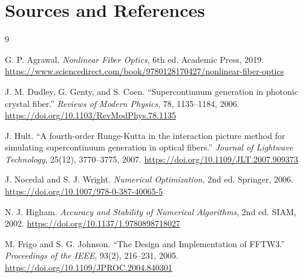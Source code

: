 \documentclass[11pt]{article}
\begin{document}
\section{Sources and References}

\begin{thebibliography}{9}

G. P. Agrawal.
\textit{Nonlinear Fiber Optics}, 6th ed.
Academic Press, 2019.
\url{https://www.sciencedirect.com/book/9780128170427/nonlinear-fiber-optics}

J. M. Dudley, G. Genty, and S. Coen.
``Supercontinuum generation in photonic crystal fiber.''
\textit{Reviews of Modern Physics}, 78, 1135--1184, 2006.
\url{https://doi.org/10.1103/RevModPhys.78.1135}

J. Hult.
``A fourth-order Runge-Kutta in the interaction picture method for simulating
supercontinuum generation in optical fibers.''
\textit{Journal of Lightwave Technology}, 25(12), 3770--3775, 2007.
\url{https://doi.org/10.1109/JLT.2007.909373}

J. Nocedal and S. J. Wright.
\textit{Numerical Optimization}, 2nd ed.
Springer, 2006.
\url{https://doi.org/10.1007/978-0-387-40065-5}

N. J. Higham.
\textit{Accuracy and Stability of Numerical Algorithms}, 2nd ed.
SIAM, 2002.
\url{https://doi.org/10.1137/1.9780898718027}

M. Frigo and S. G. Johnson.
``The Design and Implementation of FFTW3.''
\textit{Proceedings of the IEEE}, 93(2), 216--231, 2005.
\url{https://doi.org/10.1109/JPROC.2004.840301}

\end{thebibliography}
\end{document}
